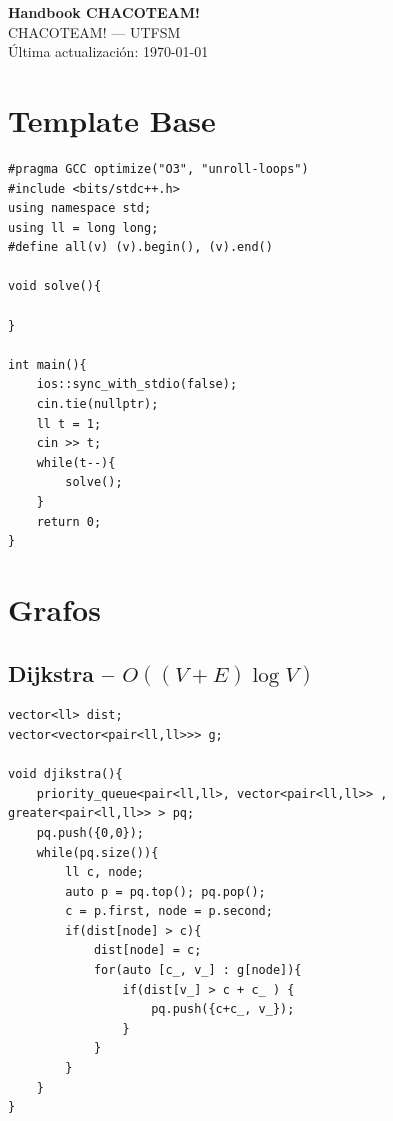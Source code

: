 \documentclass[10pt,a4paper,twocolumn]{article}
\begin{document}
	
	\begin{center}
		{\LARGE \textbf{Handbook CHACOTEAM!}} \\[4pt]
		{\large CHACOTEAM! --- UTFSM} \\[2pt]
		{\small \'Ultima actualizaci\'on: \today}
	\end{center}
	
	\tableofcontents
	\vspace{0.5cm}
	
	\section{Template Base}
	
	\begin{lstlisting}[style=cpp, title={template.cpp}]
#pragma GCC optimize("O3", "unroll-loops")
#include <bits/stdc++.h>
using namespace std;
using ll = long long;
#define all(v) (v).begin(), (v).end()

void solve(){
	
}

int main(){
	ios::sync_with_stdio(false);
	cin.tie(nullptr);
	ll t = 1;
	cin >> t;
	while(t--){
		solve();
	}
	return 0;
}
	\end{lstlisting}
	
	\section{Grafos}
	
	\subsection{Dijkstra -- $O((V+E) \log V)$}
	
	\begin{lstlisting}[style=cpp, title={dijkstra.cpp}]
vector<ll> dist;
vector<vector<pair<ll,ll>>> g;

void djikstra(){
	priority_queue<pair<ll,ll>, vector<pair<ll,ll>> , greater<pair<ll,ll>> > pq;
	pq.push({0,0});
	while(pq.size()){
		ll c, node;
		auto p = pq.top(); pq.pop();
		c = p.first, node = p.second;
		if(dist[node] > c){
			dist[node] = c;
			for(auto [c_, v_] : g[node]){
				if(dist[v_] > c + c_ ) {
					pq.push({c+c_, v_});
				}
			}
		}
	}
}
\end{lstlisting}
	
\end{document}
